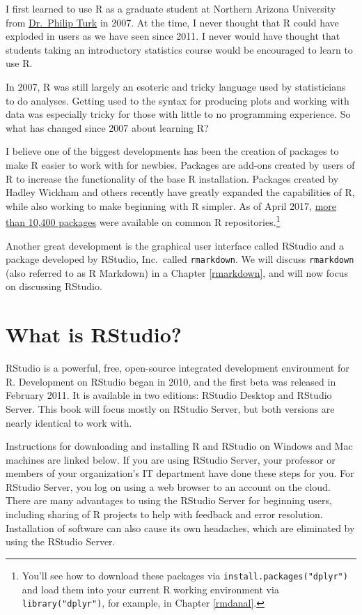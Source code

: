\documentclass[]{tufte-book}
\begin{document}
I first learned to use R as a graduate student at Northern Arizona University from \href{http://www.stat.colostate.edu/~pturk/}{Dr.~Philip Turk} in 2007. At the time, I never thought that R could have exploded in users as we have seen since 2011. I never would have thought that students taking an introductory statistics course would be encouraged to learn to use R.

In 2007, R was still largely an esoteric and tricky language used by statisticians to do analyses. Getting used to the syntax for producing plots and working with data was especially tricky for those with little to no programming experience. So what has changed since 2007 about learning R?

I believe one of the biggest developments has been the creation of packages to make R easier to work with for newbies. Packages are add-ons created by users of R to increase the functionality of the base R installation. Packages created by Hadley Wickham and others recently have greatly expanded the capabilities of R, while also working to make beginning with R simpler. As of April 2017, \href{https://cran.r-project.org/web/packages/index.html}{more than 10,400 packages} were available on common R repositories.\footnote{You'll see how to download these packages via \texttt{install.packages("dplyr")} and load them into your current R working environment via \texttt{library("dplyr")}, for example, in Chapter \ref{rmdanal}.}

Another great development is the graphical user interface called RStudio and a package developed by RStudio, Inc.~called \texttt{rmarkdown}. We will discuss \texttt{rmarkdown} (also referred to as R Markdown) in a Chapter \ref{rmarkdown}, and will now focus on discussing RStudio.

\hypertarget{what-is-rstudio}{%
\section{What is RStudio?}\label{what-is-rstudio}}

RStudio is a powerful, free, open-source integrated development environment for R. Development on RStudio began in 2010, and the first beta was released in February 2011. It is available in two editions: RStudio Desktop and RStudio Server. This book will focus mostly on RStudio Server, but both versions are nearly identical to work with.

Instructions for downloading and installing R and RStudio on Windows and Mac machines are linked below. If you are using RStudio Server, your professor or members of your organization's IT department have done these steps for you. For RStudio Server, you log on using a web browser to an account on the cloud. There are many advantages to using the RStudio Server for beginning users, including sharing of R projects to help with feedback and error resolution. Installation of software can also cause its own headaches, which are eliminated by using the RStudio Server.
\end{document}
